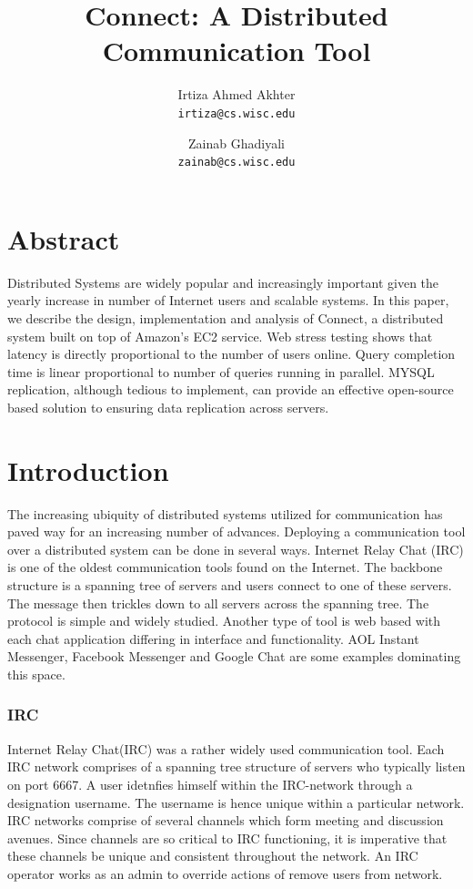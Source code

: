\documentclass[12pt]{article}
\title{Connect: A Distributed Communication Tool}
\author{Irtiza Ahmed Akhter\\
\texttt{irtiza@cs.wisc.edu} \and Zainab Ghadiyali\\ \texttt{zainab@cs.wisc.edu}}
\begin{document}
 
\maketitle

\section{Abstract} 

Distributed Systems are widely popular and increasingly
important given the yearly increase in number of Internet users and scalable
systems. In this paper, we describe the design, implementation and analysis of
Connect, a distributed system built on top of Amazon's EC2 service. Web stress
testing shows that latency is directly proportional to the number of users
online. Query completion time is linear proportional to number of queries
running in parallel. MYSQL replication, although tedious to implement, can
provide an effective open-source based solution to ensuring data replication
across servers.

\section{Introduction} 
\label{Introduction}

The increasing ubiquity of distributed systems utilized for communication has
paved way for an increasing number of advances. Deploying a communication tool
over a distributed system can be done in several ways. Internet Relay Chat (IRC)
is one of the oldest communication tools found on the Internet. The backbone
structure is a spanning tree of servers and users connect to one of these
servers. The message then trickles down to all servers across the spanning tree.
The protocol is simple and widely studied. Another type of tool is web based
with each chat application differing in interface and functionality. AOL Instant
Messenger, Facebook Messenger and Google Chat are some examples dominating this
space.
 
\subsubsection{IRC} 

Internet Relay Chat(IRC\cite{IRC}) was a rather widely used
communication tool. Each IRC network comprises of a spanning tree structure of
servers who typically listen on port 6667. A user idetnfies himself within the
IRC-network through a designation username. The username is hence unique within
a particular network.  IRC networks comprise of several channels which form
meeting and discussion avenues. Since channels are so critical to IRC
functioning, it is imperative that these channels be unique and consistent
throughout the network. An IRC operator works as an admin to override actions of
remove users from network.  
\end{document}
